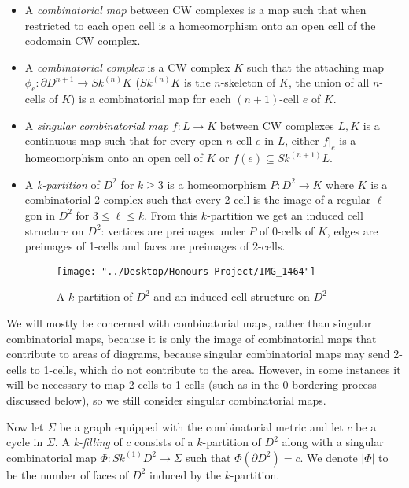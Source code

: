 \documentclass[12pt]{article}
\newcommand{\vs}{\vskip10pt}
\begin{document}
	\begin{itemize}
		\item A \textit{combinatorial map} between CW complexes is a map such that when restricted to each open cell is a homeomorphism onto an open cell of the codomain CW complex. 
		\item A \textit{combinatorial complex} is a CW complex $K$ such that the attaching map $\phi_e: \partial D^{n+1} \rightarrow Sk^{(n)}K$ ($Sk^{(n)}K$ is the $n$-skeleton of $K$, the union of all $n$-cells of $K$) is a combinatorial map for each $(n+1)$-cell $e$ of $K$. 
		\item A \textit{singular combinatorial map} $f: L \rightarrow K$ between CW complexes $L,K$ is a continuous map such that for every open $n$-cell $e$ in $L$, either $f \vert_e$ is a homeomorphism onto an open cell of $K$ or $f(e) \subseteq Sk^{(n+1)} L$. 
		\item A \textit{k-partition} of $D^2$ for $k \geq 3$ is a homeomorphism $P: D^2 \rightarrow K$ where $K$ is a combinatorial 2-complex such that every 2-cell is the image of a regular $\ell$-gon in $D^2$ for $3 \leq \ell \leq k$. From this $k$-partition we get an induced cell structure on $D^2$: vertices are preimages under $P$ of 0-cells of $K$, edges are preimages of 1-cells and faces are preimages of 2-cells. 
		
		
\begin{figure} [H]
	\centering
	\texttt{[image: "../Desktop/Honours Project/IMG\_1464"]}
	\caption{A $k$-partition of $D^2$ and an induced cell structure on $D^2$}
	\label{fig:img1464}
\end{figure}
		
	\end{itemize} 

	We will mostly be concerned with combinatorial maps, rather than singular combinatorial maps, because it is only the image of combinatorial maps that contribute to areas of diagrams, because singular combinatorial maps may send 2-cells to 1-cells, which do not contribute to the area. However, in some instances it will be necessary to map 2-cells to 1-cells (such as in the 0-bordering process discussed below), so we still consider singular combinatorial maps. 
	
	\vs

	Now let $\Sigma$ be a graph equipped with the combinatorial metric and let $c$ be a cycle in $\Sigma$. A \textit{k-filling} of $c$ consists of a $k$-partition of $D^2$ along with a singular combinatorial map $\Phi: Sk^{(1)} D^2 \rightarrow \Sigma$ such that $\Phi(\partial D^2) = c$. We denote $\vert \Phi \vert$ to be the number of faces of $D^2$ induced by the $k$-partition. 
	
\end{document}

